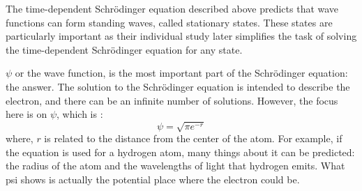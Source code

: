 {The time-dependent Schr\"{o}dinger equation described above predicts that wave functions can form standing waves, called stationary states. These states are particularly important as their individual study later simplifies the task of solving the time-dependent Schr\"{o}dinger equation for any state.

$\psi$ or the wave function, is the most important part of the Schr\"{o}dinger equation: the answer. The solution to the Schr\"{o}dinger equation is intended to describe the electron, and there can be an infinite number of solutions. However, the focus here is on $\psi$, which is :
\begin{equation}
    \psi = \sqrt{\pi e^{-r}}
\end{equation} 
where, $r$ is related to the distance from the center of the atom.
\vspace{5mm}
For example, if the equation is used for a hydrogen atom, many things about it can be predicted: the radius of the atom and the wavelengths of light that hydrogen emits. What psi shows is actually the potential place where the electron could be.
}
